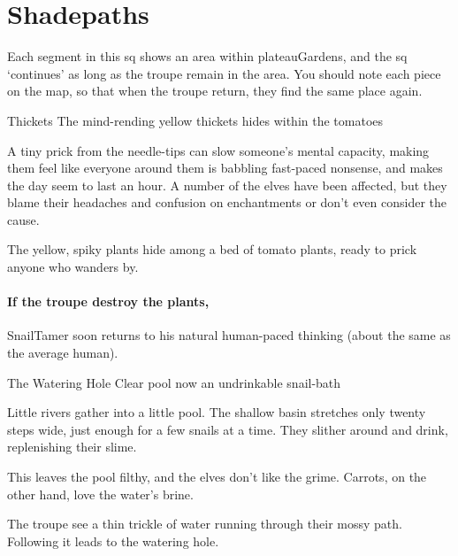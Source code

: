 \section{Shadepaths}




\begin{multicols}{2}

Each \gls{segment} in this \gls{sq} shows an area within \gls{plateauGardens}, and the \gls{sq} `continues' as long as the troupe remain in the \gls{area}.
You should note each piece on the map, so that when the troupe return, they find the same place again.

{ Thickets}%
{The mind-rending yellow thickets hides within the tomatoes}%

A tiny prick from the needle-tips can slow someone's mental capacity, making them feel like everyone around them is babbling fast-paced nonsense, and makes the day seem to last an hour.
A number of the elves have been affected, but they blame their headaches and confusion on enchantments or don't even consider the cause.

The yellow, spiky plants hide among a bed of tomato plants, ready to prick anyone who wanders by.

\paragraph{If the troupe destroy the plants,}
\gls{SnailTamer} soon returns to his natural human-paced thinking (about the same as the average human).

{The Watering Hole}%
{Clear pool now an undrinkable snail-bath}%

Little rivers gather into a little pool.
The shallow basin stretches only twenty steps wide, just enough for a few snails at a time.
They slither around and drink, replenishing their slime.

This leaves the pool filthy, and the elves don't like the grime.
Carrots, on the other hand, love the water's brine.

The troupe see a thin trickle of water running through their mossy path.
Following it leads to the watering hole.


\end{multicols}
